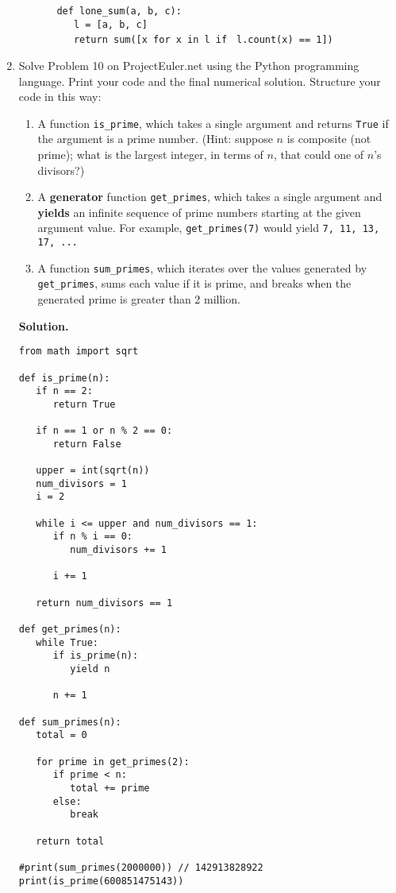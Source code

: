 \documentclass[9pt]{article}
\begin{document}
\begin{enumerate}
\begin{enumerate}
\begin{itemize}
                        \verb|def lone_sum(a, b, c):| \\
                        \verb|   l = [a, b, c]| \\
                        \verb|   return sum([x for x in l if |
                        \verb|l.count(x) == 1])|
               \end{itemize}
      \end{enumerate}
   \item Solve Problem 10 on ProjectEuler.net using the Python programming 
         language. Print your code and the final numerical solution. Structure 
         your code in this way:
         \begin{enumerate}
            \item A function \verb|is_prime|, which takes a single argument and
                  returns \verb|True| if the argument is a prime number. (Hint:
                  suppose $n$ is composite (not prime); what is the largest
                  integer, in terms of $n$, that could one of $n$'s divisors?)
            \item A \textbf{generator} function \verb|get_primes|, which takes a
                  single argument and \textbf{yields} an infinite sequence of
                  prime numbers starting at the given argument value. For
                  example, \verb|get_primes(7)| would yield
                  \verb|7, 11, 13, 17, ...|
            \item A function \verb|sum_primes|, which iterates over the values
                  generated by \verb|get_primes|, sums each value if it is
                  prime, and breaks when the generated prime is greater than 2
                  million.
         \end{enumerate}

      \textbf{Solution.}

      \begin{verbatim}
from math import sqrt

def is_prime(n):
   if n == 2:
      return True

   if n == 1 or n % 2 == 0:
      return False

   upper = int(sqrt(n))
   num_divisors = 1
   i = 2

   while i <= upper and num_divisors == 1:
      if n % i == 0:
         num_divisors += 1

      i += 1

   return num_divisors == 1

def get_primes(n):
   while True:
      if is_prime(n):
         yield n
      
      n += 1

def sum_primes(n):
   total = 0

   for prime in get_primes(2):
      if prime < n:
         total += prime 
      else:
         break
      
   return total

#print(sum_primes(2000000)) // 142913828922
print(is_prime(600851475143))
      \end{verbatim}
\end{enumerate}
\end{document}
